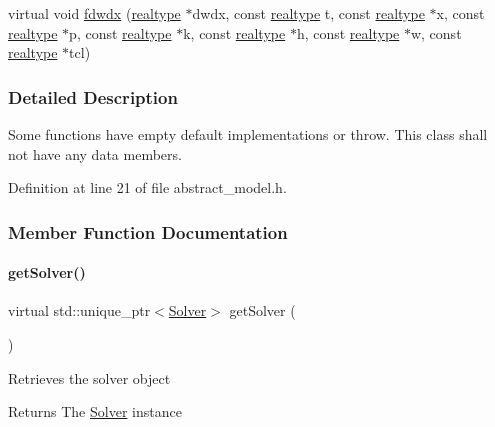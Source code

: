 \begin{DoxyCompactItemize}
\item 
virtual void \mbox{\hyperlink{classamici_1_1_abstract_model_ab88df32c6c55a17ed30e3ede9396cc53}{fdwdx}} (\mbox{\hyperlink{namespaceamici_a1bdce28051d6a53868f7ccbf5f2c14a3}{realtype}} $\ast$dwdx, const \mbox{\hyperlink{namespaceamici_a1bdce28051d6a53868f7ccbf5f2c14a3}{realtype}} t, const \mbox{\hyperlink{namespaceamici_a1bdce28051d6a53868f7ccbf5f2c14a3}{realtype}} $\ast$x, const \mbox{\hyperlink{namespaceamici_a1bdce28051d6a53868f7ccbf5f2c14a3}{realtype}} $\ast$p, const \mbox{\hyperlink{namespaceamici_a1bdce28051d6a53868f7ccbf5f2c14a3}{realtype}} $\ast$k, const \mbox{\hyperlink{namespaceamici_a1bdce28051d6a53868f7ccbf5f2c14a3}{realtype}} $\ast$h, const \mbox{\hyperlink{namespaceamici_a1bdce28051d6a53868f7ccbf5f2c14a3}{realtype}} $\ast$w, const \mbox{\hyperlink{namespaceamici_a1bdce28051d6a53868f7ccbf5f2c14a3}{realtype}} $\ast$tcl)
\end{DoxyCompactItemize}


\subsubsection{Detailed Description}
Some functions have empty default implementations or throw. This class shall not have any data members. 

Definition at line 21 of file abstract\+\_\+model.\+h.



\subsubsection{Member Function Documentation}
\mbox{\label{classamici_1_1_abstract_model_a61d5b19b2e4d5ffcc73a014d59494344}} 
\paragraph{\texorpdfstring{getSolver()}{getSolver()}}
{\footnotesize\ttfamily virtual std\+::unique\+\_\+ptr$<$\mbox{\hyperlink{classamici_1_1_solver}{Solver}}$>$ get\+Solver (\begin{DoxyParamCaption}{ }\end{DoxyParamCaption})\hspace{0.3cm}{\ttfamily [pure virtual]}}

Retrieves the solver object \begin{DoxyReturn}{Returns}
The \mbox{\hyperlink{classamici_1_1_solver}{Solver}} instance 
\end{DoxyReturn}


